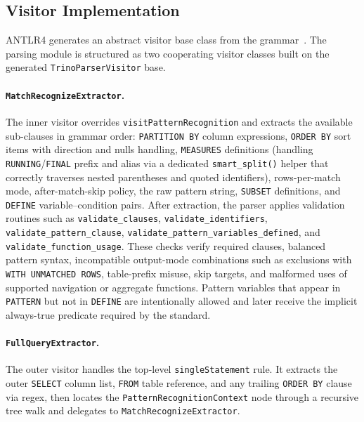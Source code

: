 \subsection{Visitor Implementation}
\label{subsec:meth-visitor}

ANTLR4 generates an abstract visitor base class from the grammar~\cite{robson2022designpatterns}.
The parsing module is structured as two cooperating visitor classes
built on the generated \texttt{TrinoParserVisitor} base.

\paragraph{\texttt{MatchRecognizeExtractor}.}
The inner visitor overrides \texttt{visitPatternRecognition}
and extracts the available sub-clauses in grammar order:
\texttt{PARTITION~BY} column expressions,
\texttt{ORDER~BY} sort items with direction and nulls handling,
\texttt{MEASURES} definitions (handling \texttt{RUNNING}/\texttt{FINAL}
prefix and alias via a dedicated \texttt{smart\_split()} helper that
correctly traverses nested parentheses and quoted identifiers),
rows-per-match mode, after-match-skip policy, the raw pattern string,
\texttt{SUBSET} definitions, and \texttt{DEFINE} variable--condition
pairs.  After extraction, the parser applies validation routines such
as \texttt{validate\_clauses}, \texttt{validate\_identifiers},
\texttt{validate\_pattern\_clause},
\texttt{validate\_pattern\_variables\_defined}, and
\texttt{validate\_function\_usage}.  These checks verify required
clauses, balanced pattern syntax, incompatible output-mode
combinations such as exclusions with \texttt{WITH UNMATCHED ROWS},
table-prefix misuse, skip targets, and malformed uses of supported
navigation or aggregate functions.  Pattern variables that appear in
\texttt{PATTERN} but not in \texttt{DEFINE} are intentionally allowed
and later receive the implicit always-true predicate required by the
standard.

\paragraph{\texttt{FullQueryExtractor}.}
The outer visitor handles the top-level \texttt{singleStatement}
rule.  It extracts the outer \texttt{SELECT} column list, \texttt{FROM}
table reference, and any trailing \texttt{ORDER~BY} clause via regex,
then locates the \texttt{PatternRecognitionContext} node through a
recursive tree walk and delegates to \texttt{MatchRecognizeExtractor}.

